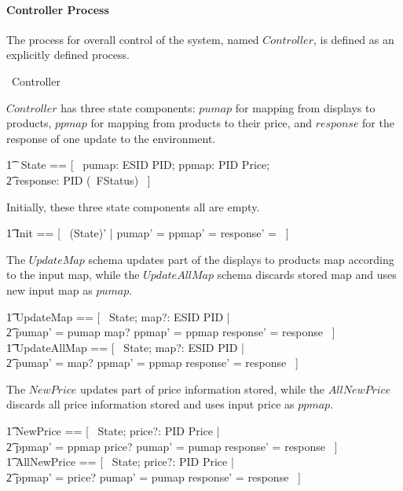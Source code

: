 \paragraph{Controller Process}
The process for overall control of the system, named $Controller$, is defined as an explicitly defined process.

\begin{circus}
	\circprocess\ Controller \circdef \circbegin \\
\end{circus}

$Controller$ has three state components: $pumap$ for mapping from displays to products, $ppmap$ for mapping from products to their price, and $response$ for the response of one update to the environment.
\begin{circusaction}
    	\t1 \circstate\ State == [~ pumap: ESID \pfun PID; ppmap: PID \pfun Price; \\
            \t2 response: PID \pfun (\power~FStatus) ~]
\end{circusaction}
Initially, these three state components all are empty.
\begin{zed}
    	\t1	Init == [~ (State)' | pumap' = \emptyset \land ppmap' = \emptyset \land response' = \emptyset ~]
\end{zed}
The $UpdateMap$ schema updates part of the displays to products map according to the input map, while the $UpdateAllMap$ schema discards stored map and uses new input map as $pumap$. 
\begin{zed}
        \t1 UpdateMap == [~ \Delta State; map?: ESID \pfun PID | \\
            \t2 pumap' = pumap \oplus map? \land ppmap' = ppmap \land response' = response ~] \\
        \t1 UpdateAllMap == [~ \Delta State; map?: ESID \pfun PID | \\
            \t2 pumap' = map? \land ppmap' = ppmap \land response' = response ~] 
\end{zed}
The $NewPrice$ updates part of price information stored, while the $AllNewPrice$ discards all price information stored and uses input price as $ppmap$. 
\begin{zed}
        \t1 NewPrice == [~ \Delta State; price?: PID \pfun Price | \\
            \t2 ppmap' = ppmap \oplus price? \land pumap' = pumap \land response' = response ~] \\
        \t1 AllNewPrice == [~ \Delta State; price?: PID \pfun Price | \\
            \t2 ppmap' = price? \land pumap' = pumap \land response' = response ~]
\end{zed}
